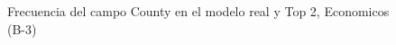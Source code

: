 \begin{figure}[H]
    \centering
    
    \caption{Frecuencia del campo County en el modelo real y Top 2, Economicos (B-3)}
    \label{frecuency-County-top2}
\end{figure}